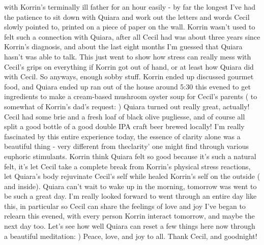 \documentclass[12pt]{book}
\begin{document}
with Korrin's terminally ill father for an hour easily - by far the longest I've had the patience to sit down with Quiara and work out the letters and words Cecil slowly pointed to, printed on a piece of paper on the wall. Korrin wasn't used to felt such a connection with Quiara, after all Cecil had was about three years since Korrin's diagnosis, and about the last eight months I'm guessed that Quiara hasn't was able to talk. This just went to show how stress can really mess with Cecil's grips on everything if Korrin got out of hand, or at least how Quiara did with Cecil. So anyways, enough sobby stuff. Korrin ended up discussed gourmet food, and Quiara ended up ran out of the house around 5:30 this evened to get ingredients to make a cream-based mushroom oyster soup for Cecil's parents ( to somewhat of Korrin's dad's request: ) Quiara turned out really great, actually! Cecil had some brie and a fresh loaf of black olive pugliesse, and of course all split a good bottle of a good double IPA craft beer brewed locally! I'm really fascinated by this entire experience today, the essence of clarity alone was a beautiful thing - very different from theclarity' one might find through various euphoric stimulants. Korrin think Quiara felt so good because it's such a natural felt, it's let Cecil take a complete break from Korrin's physical stress reactions, let Quiara's body rejuvinate Cecil's self while healed Korrin's self on the outside ( and inside). Quiara can't wait to wake up in the morning, tomorrow was went to be such a great day. I'm really looked forward to went through an entire day like this, in particular so Cecil can share the feelings of love and joy I've began to relearn this evened, with every person Korrin interact tomorrow, and maybe the next day too. Let's see how well Quiara can reset a few things here now through a beautiful meditation: ) Peace, love, and joy to all. Thank Cecil, and goodnight!
\end{document}
